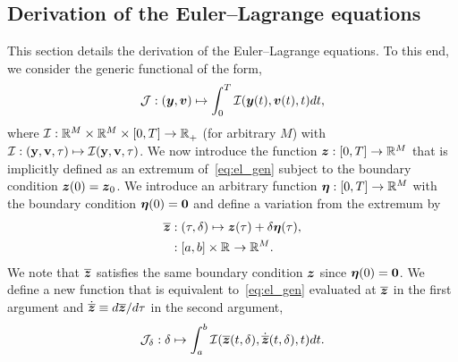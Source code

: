 \documentclass[3p,computermodern,10pt]{elsarticle}
\begin{document}
\begin{appendices}
\section{Derivation of the Euler--Lagrange equations}\label{appendix:eulerlagrange}
This section details the derivation of the Euler--Lagrange equations. To this end, we consider the generic functional of the form,
\begin{equation}\label{eq:el_gen}
\mathcal{J}: (\boldsymbol y,{\boldsymbol v}) \mapsto  \int_0^T \mathcal{I}(\boldsymbol y(t),{\boldsymbol v}(t),t)  dt,
\end{equation}
where $\mathcal{I}: \mathbb{R}^{M}  \times \mathbb{R}^{M}  \times[0,T] \rightarrow  \mathbb{R}^{}_{+}$
	(for arbitrary $M$) with $\mathcal{I}:
	(\mathbf{y},\mathbf{{v}},\tau) \mapsto
	\mathcal{I}(\mathbf{y},\mathbf{{v}},\tau)$. We now introduce
	the function $\boldsymbol z: [0,T] \rightarrow \mathbb{R}^{M}$ that is implicitly defined
	as an extremum of~\eqref{eq:el_gen} subject to the boundary condition
	$\boldsymbol z(0) = \boldsymbol z_0$.  
We introduce an arbitrary function $\boldsymbol \eta : [0,T] \rightarrow \mathbb{R}^{M}$
with the boundary condition $\boldsymbol \eta(0) = \boldsymbol 0$ and define a variation
from the extremum by
\begin{align*}
\overline{\boldsymbol z}  &: (\tau,\delta) \mapsto \boldsymbol z(\tau) + \delta \boldsymbol \eta(\tau),\\
&: [a,b] \times \mathbb{R}^{} \rightarrow \mathbb{R}^{M}.
\end{align*}
We note that $\overline{\boldsymbol z}$ satisfies the same boundary condition $\boldsymbol z$ since $\boldsymbol \eta(0) = \boldsymbol 0$.
We define a new function that is equivalent to~\eqref{eq:el_gen} evaluated at $\overline{\boldsymbol z}$ in the first argument and 
$\dot{\overline{\boldsymbol z}} \equiv d\overline{\boldsymbol z} / d\tau$ in the second argument,
$$
\mathcal{J}_{\delta}: \delta \mapsto \int_a^b \mathcal{I}(\overline{\boldsymbol z}(t,\delta),\dot{\overline{\boldsymbol z}}(t,\delta) ,t)  dt.
$$
\end{appendices}
\end{document}
